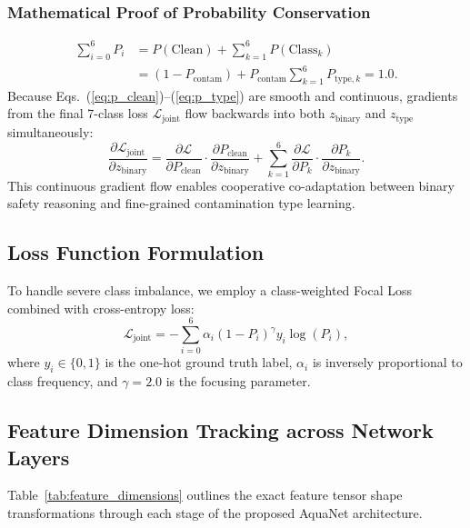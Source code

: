 \documentclass[journal]{IEEEtran}
\newcommand{\method}{AquaNet}
\begin{document}
\subsubsection{Mathematical Proof of Probability Conservation}
\begin{equation}
\begin{aligned}
\sum_{i=0}^6 P_i &= P(\text{Clean}) + \sum_{k=1}^6 P(\text{Class}_k) \\
&= (1 - P_{\text{contam}}) + P_{\text{contam}} \sum_{k=1}^6 P_{\text{type}, k} = 1.0.
\end{aligned}
\end{equation}
Because Eqs.~(\ref{eq:p_clean})--(\ref{eq:p_type}) are smooth and continuous, gradients from the final 7-class loss $\mathcal{L}_{\text{joint}}$ flow backwards into both $z_{\text{binary}}$ and $z_{\text{type}}$ simultaneously:
\begin{equation}
\frac{\partial \mathcal{L}_{\text{joint}}}{\partial z_{\text{binary}}} = \frac{\partial \mathcal{L}}{\partial P_{\text{clean}}} \cdot \frac{\partial P_{\text{clean}}}{\partial z_{\text{binary}}} + \sum_{k=1}^6 \frac{\partial \mathcal{L}}{\partial P_k} \cdot \frac{\partial P_k}{\partial z_{\text{binary}}}.
\end{equation}
This continuous gradient flow enables cooperative co-adaptation between binary safety reasoning and fine-grained contamination type learning.

\subsection{Loss Function Formulation}
To handle severe class imbalance, we employ a class-weighted Focal Loss \cite{focal_loss_lin_2017} combined with cross-entropy loss:
\begin{equation}
\mathcal{L}_{\text{joint}} = -\sum_{i=0}^6 \alpha_i (1 - P_i)^{\gamma} y_i \log(P_i),
\label{eq:focal_loss}
\end{equation}
where $y_i \in \{0, 1\}$ is the one-hot ground truth label, $\alpha_i$ is inversely proportional to class frequency, and $\gamma=2.0$ is the focusing parameter.

\subsection{Feature Dimension Tracking across Network Layers}
Table~\ref{tab:feature_dimensions} outlines the exact feature tensor shape transformations through each stage of the proposed \method{} architecture.
\end{document}
